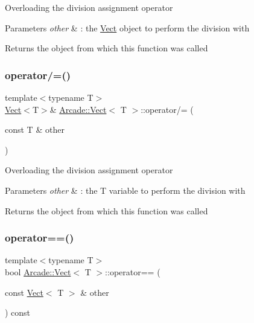 Overloading the division assignment operator 
\begin{DoxyParams}{Parameters}
{\em other} & \+: the \hyperlink{class_arcade_1_1_vect}{Vect} object to perform the division with \\
\hline
\end{DoxyParams}
\begin{DoxyReturn}{Returns}
the object from which this function was called 
\end{DoxyReturn}
\mbox{\label{class_arcade_1_1_vect_a6777436fa526fb4397c169dd1a7fe6e5}} 
\subsubsection{\texorpdfstring{operator/=()}{operator/=()}\hspace{0.1cm}{\footnotesize\ttfamily [2/2]}}
{\footnotesize\ttfamily template$<$typename T$>$ \\
\hyperlink{class_arcade_1_1_vect}{Vect}$<$T$>$\& \hyperlink{class_arcade_1_1_vect}{Arcade\+::\+Vect}$<$ T $>$\+::operator/= (\begin{DoxyParamCaption}\item[{const T \&}]{other }\end{DoxyParamCaption})\hspace{0.3cm}{\ttfamily [inline]}}

Overloading the division assignment operator 
\begin{DoxyParams}{Parameters}
{\em other} & \+: the T variable to perform the division with \\
\hline
\end{DoxyParams}
\begin{DoxyReturn}{Returns}
the object from which this function was called 
\end{DoxyReturn}
\mbox{\label{class_arcade_1_1_vect_a553d8d71f49bd9623a1bfa6c01c28174}} 
\subsubsection{\texorpdfstring{operator==()}{operator==()}}
{\footnotesize\ttfamily template$<$typename T$>$ \\
bool \hyperlink{class_arcade_1_1_vect}{Arcade\+::\+Vect}$<$ T $>$\+::operator== (\begin{DoxyParamCaption}\item[{const \hyperlink{class_arcade_1_1_vect}{Vect}$<$ T $>$ \&}]{other }\end{DoxyParamCaption}) const\hspace{0.3cm}{\ttfamily [inline]}}



